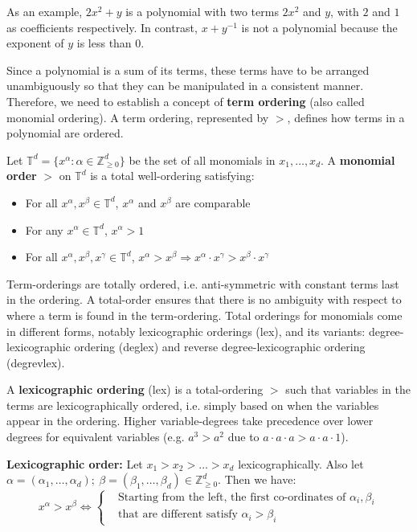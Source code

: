 As an example, $2x^2+y$ is a polynomial with two terms $2x^2$ and $y$, with 
$2$ and $1$ as coefficients respectively. 
In contrast, $x+y^{-1}$ is not a polynomial because the exponent of $y$ is 
less than $0$.

Since a polynomial is a sum of its terms,
these terms have to be arranged unambiguously so that they can be 
manipulated in a consistent manner.
Therefore, we need to establish a concept of 
{\bf term ordering} (also called monomial ordering).
A term ordering, represented by $>$, defines how
terms in a polynomial are ordered.
\begin{Definition}
Let $\mathbb{T}^{d}=\{x^{\alpha}: \alpha\in \mathbb{Z}_{\ge 0}^{d}\}$ be the set of all monomials in $x_{1},\dots,x_{d}$.
A {\bf monomial order} $>$ on $\mathbb{T}^{d}$ is a total well-ordering satisfying:
\begin{itemize}
        \item For all $x^{\alpha}, x^{\beta} \in \mathbb{T}^{d}$, $x^{\alpha}$ and $x^{\beta}$ are comparable
	\item For any $x^{\alpha} \in \mathbb{T}^{d}$, $x^{\alpha}>1$
	\item For all $x^{\alpha}, x^{\beta}, x^{\gamma} \in \mathbb{T}^{d}$, $x^{\alpha}>x^{\beta} \Rightarrow x^{\alpha} \cdot x^{\gamma}> x^{\beta} \cdot x^{\gamma}$
\end{itemize}
\end{Definition}

Term-orderings are totally ordered, i.e. anti-symmetric with constant terms
last in the ordering.
A total-order ensures that there is no ambiguity with respect to where a 
term is found in the term-ordering.  Total orderings for monomials come in 
different forms, notably 
lexicographic orderings (lex), and its variants: degree-lexicographic ordering (deglex) 
and reverse degree-lexicographic ordering (degrevlex).

A {\bf lexicographic ordering} (lex) is a total-ordering $>$ such that 
variables in the terms are lexicographically ordered, i.e. simply based on 
when the variables appear in the ordering.
Higher variable-degrees take 
precedence over lower degrees for equivalent variables (e.g. $a^3 > a^2$ due to $a \cdot a \cdot a > a \cdot a \cdot 1$).
\begin{Definition}
{\bf Lexicographic order:} Let $x_1 > x_2 > \dots > x_d$
lexicographically. Also let $\alpha = (\alpha_1, \dots, \alpha_d);
~\beta = (\beta_1, \dots, \beta_d) \in \mathbb{Z}^d_{\geq 0}$. Then we
have: 
\begin{equation}
x^{\alpha} > x^{\beta} \iff 
\begin{cases}
& \text{Starting  from the  left, the first co-ordinates of $\alpha_i, \beta_i$} \\
& \text{that are different satisfy $\alpha_i > \beta_i$}

\end{cases}
\end{equation}
\end{Definition}

